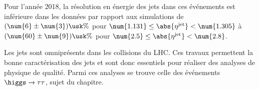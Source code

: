 Pour l'année 2018, la résolution en énergie des jets dans ces événements est inférieure dans les données par rapport aux simulations
de
$(\num{6}\pm\num{3})\usk\%$ pour $\num{1.131} \leq \abs{\eta^\text{jet}} < \num{1.305}$
à
$(\num{60}\pm\num{9})\usk\%$ pour $\num{2.5} \leq \abs{\eta^\text{jet}} < \num{2.8}$.
\par Les jets sont omniprésents dans les collisions du LHC.
Ces travaux permettent la bonne caractérisation des jets et sont donc essentiels pour réaliser des analyses de physique de qualité.
Parmi ces analyses se trouve celle des événements $\higgs\to\tau\tau$, sujet du chapitre.